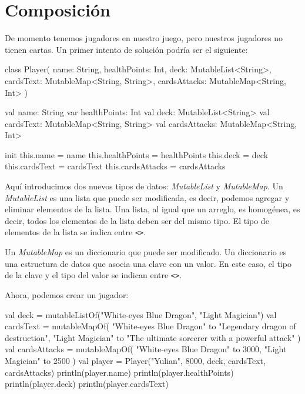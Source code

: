 \section{Composición}

  De momento tenemos jugadores en nuestro juego, pero nuestros jugadores no tienen cartas.
  Un primer intento de solución podría ser el siguiente:

  \begin{kotlin}
    class Player(
      name: String,
      healthPoints: Int,
      deck: MutableList<String>,
      cardsText: MutableMap<String, String>,
      cardsAttacks: MutableMap<String, Int>
    ) {
      val name: String
      var healthPoints: Int
      val deck: MutableList<String>
      val cardsText: MutableMap<String, String>
      val cardsAttacks: MutableMap<String, Int>

      init {
        this.name = name
        this.healthPoints = healthPoints
        this.deck = deck
        this.cardsText = cardsText
        this.cardsAttacks = cardsAttacks
      }
    }
  \end{kotlin}

  Aquí introducimos dos nuevos tipos de datos: 
  \textit{MutableList}\autocite{MutableListKotlinProgramming} y 
  \textit{MutableMap}.\autocite{MutableMapKotlinProgramming}
  Un \textit{MutableList} es una lista que puede ser modificada, es decir, podemos agregar y
  eliminar elementos de la lista.
  Una lista, al igual que un arreglo, es homogénea, es decir, todos los elementos de la lista
  deben ser del mismo tipo.
  El tipo de elementos de la lista se indica entre \texttt{<>}.

  Un \textit{MutableMap} es un diccionario que puede ser modificado.
  Un diccionario es una estructura de datos que asocia una clave con un valor.
  En este caso, el tipo de la clave y el tipo del valor se indican entre \texttt{<>}.

  Ahora, podemos crear un jugador:

  \begin{kotlin}
    val deck = mutableListOf("White-eyes Blue Dragon", "Light Magician")
    val cardsText = mutableMapOf(
      "White-eyes Blue Dragon" to "Legendary dragon of destruction",
      "Light Magician" to "The ultimate sorcerer with a powerful attack"
    )
    val cardsAttacks = mutableMapOf(
      "White-eyes Blue Dragon" to 3000,
      "Light Magician" to 2500
    )
    val player = Player("Yulian", 8000, deck, cardsText, cardsAttacks)
    println(player.name)
    println(player.healthPoints)
    println(player.deck)
    println(player.cardsText)
  \end{kotlin}

